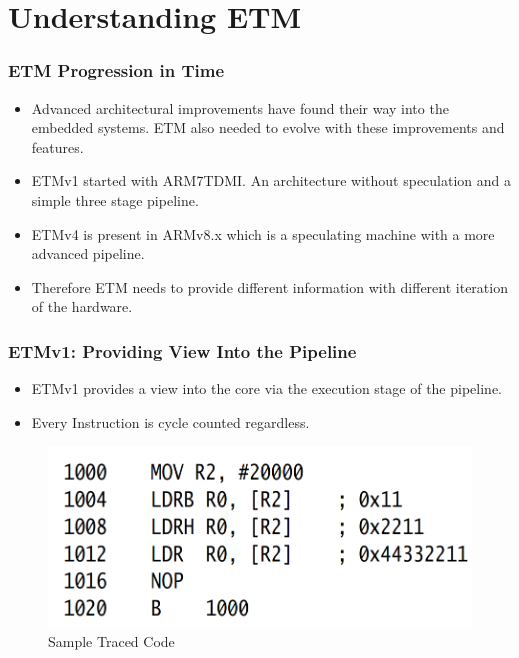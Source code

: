 \documentclass{beamer}
\begin{document}
\section{Understanding ETM}
\begin{frame}
    \frametitle{ETM Progression in Time}
    \begin{itemize}
        \item Advanced architectural improvements have found their way
            into the embedded systems. ETM also needed to evolve with these
            improvements and features.
        \item ETMv1 started with ARM7TDMI. An architecture without speculation
            and a simple three stage pipeline.
        \item ETMv4 is present in ARMv8.x which is a speculating machine with
            a more advanced pipeline.
        \item Therefore ETM needs to provide different information with
            different iteration of the hardware.
    \end{itemize}
\end{frame}
\begin{frame}
    \frametitle{ETMv1: Providing View Into the Pipeline}
    \begin{itemize}
        \item ETMv1 provides a view into the core via the execution stage of
            the pipeline.
        \item Every Instruction is cycle counted regardless.
    \end{itemize}
        \begin{figure}
        \centering
        \includegraphics[width=0.80\columnwidth]{etmv11.png}
        \caption{Sample Traced Code}
        \label{fig:ETMv11}
    \end{figure}
\end{frame}
\end{document}

